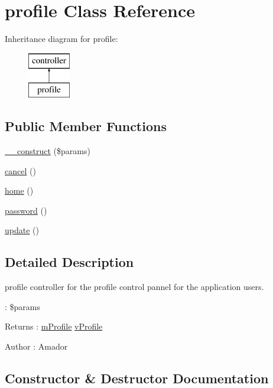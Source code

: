 \hypertarget{classprofile}{}\section{profile Class Reference}
\label{classprofile}
Inheritance diagram for profile\+:\begin{figure}[H]
\begin{center}
\leavevmode
\includegraphics[height=2.000000cm]{classprofile}
\end{center}
\end{figure}
\subsection*{Public Member Functions}
\begin{DoxyCompactItemize}
\item 
\hyperlink{classprofile_af66f7febba4451a1b69ea3272323fb1d}{\+\_\+\+\_\+construct} (\$params)
\item 
\hyperlink{classprofile_aade2c189892aa6fb0d3d646de10272ea}{cancel} ()
\item 
\hyperlink{classprofile_a38484ee7b36bb552ad17a2dbee4ff55b}{home} ()
\item 
\hyperlink{classprofile_a45720e4b208cc076ee8494e49e7e5987}{password} ()
\item 
\hyperlink{classprofile_a45686873099b9069fdf1aa3419adfbe7}{update} ()
\end{DoxyCompactItemize}


\subsection{Detailed Description}
profile controller for the profile control pannel for the application users.

\+: \$params \begin{DoxyReturn}{Returns}
\+: \hyperlink{classmProfile}{m\+Profile} \hyperlink{classvProfile}{v\+Profile} 
\end{DoxyReturn}
\begin{DoxyAuthor}{Author}
\+: Amador 
\end{DoxyAuthor}


\subsection{Constructor \& Destructor Documentation}
\hypertarget{classprofile_af66f7febba4451a1b69ea3272323fb1d}{}
